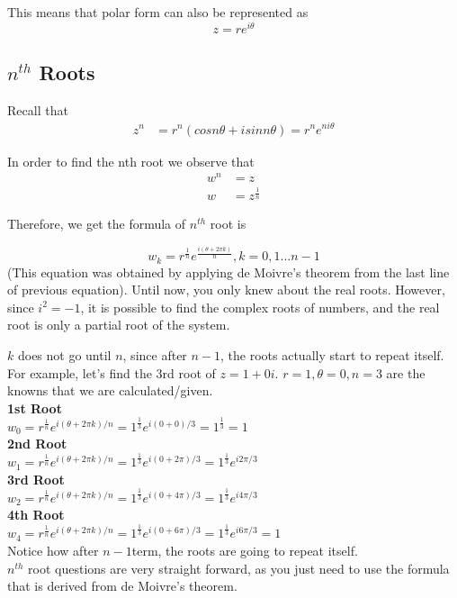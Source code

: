 \documentclass[12pt]{article}
\begin{document}
This means that polar form can also be represented as 
\begin{equation}
z = re^{i\theta}
\end{equation}


\subsection{$n^{th}$ Roots}
Recall that 
\begin{equation}
\begin{split}
z^n &= r^n(cosn\theta + isinn\theta) = r^ne^{ni\theta}
\end{split}
\end{equation}

In  order to find the nth root we observe that
\begin{equation}
\begin{split}
w^n &= z\\
w &= z^{\frac{1}{n}} 
\end{split}
\end{equation}

Therefore, we get the formula of $n^{th}$ root is 

\begin{equation}
w_k = r^{\frac{1}{n}}e^{\frac{i(\theta+2\pi k)}{n}}, k = 0,1...n-1
\end{equation}
(This equation was obtained by applying de Moivre's theorem from the last line of previous equation).
Until now, you only knew about the real roots. However, since $i^2 = -1$, it is possible to find the complex roots of numbers, and the real root is only a partial root of the system.

$k$ does not go until $n$, since after $n-1$, the roots actually start to repeat itself. \\
For example, let's find the 3rd root of $z = 1 + 0i$. $r = 1, \theta = 0, n=3$ are the knowns that we are calculated/given.\\
\textbf{1st Root}\\
$w_0 = r^{\frac{1}{n}}e^{i(\theta+2\pi k)/n} = 1^{\frac{1}{3}}e^{i(0+0)/3} = 1^{\frac{1}{3}} = 1$\\
\textbf{2nd Root}\\
$w_1 = r^{\frac{1}{n}}e^{i(\theta+2\pi k)/n} = 1^{\frac{1}{3}}e^{i(0+2\pi)/3} = 1^{\frac{1}{3}}e^{i2\pi/3}$\\
\textbf{3rd Root}\\
$w_2 = r^{\frac{1}{n}}e^{i(\theta+2\pi k)/n} = 1^{\frac{1}{3}}e^{i(0+4\pi)/3} = 1^{\frac{1}{3}}e^{i4\pi/3}$\\
\textbf{4th Root}\\
$w_4 = r^{\frac{1}{n}}e^{i(\theta+2\pi k)/n} = 1^{\frac{1}{3}}e^{i(0+6\pi)/3} = 1^{\frac{1}{3}}e^{i6\pi/3} = 1$\\
Notice how after $n-1$term, the roots are going to repeat itself.\\
$n^{th}$ root questions are very straight forward, as you just need to use the formula that is derived from de Moivre's theorem.
\end{document}
